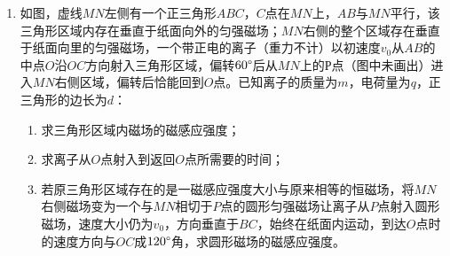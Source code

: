\begin{enumerate}
\newpage
\item 
如图，虚线$ MN $左侧有一个正三角形$ ABC $，$ C $点在$ MN $上，$ AB $与$ MN $平行，该三角形区域内存在垂直于纸面向外的匀强磁场；$ MN $右侧的整个区域存在垂直于纸面向里的匀强磁场，一个带正电的离子（重力不计）以初速度$ v_{0} $从$ AB $的中点$ O $沿$ OC $方向射入三角形区域，偏转$ 60 \degree  $后从$ MN $上的Р点（图中未画出）进入$ MN $右侧区域，偏转后恰能回到$ O $点。已知离子的质量为$ m $，电荷量为$ q $，正三角形的边长为$ d $：
\begin{enumerate}
	\item
	求三角形区域内磁场的磁感应强度；
	\item 
	求离子从$ O $点射入到返回$ O $点所需要的时间； 
	\item 
	若原三角形区域存在的是一磁感应强度大小与原来相等的恒磁场，将$ MN $右侧磁场变为一个与$ MN $相切于$ P $点的圆形匀强磁场让离子从$ P $点射入圆形磁场，速度大小仍为$ v_{0} $，方向垂直于$ BC $，始终在纸面内运动，到达$ O $点时的速度方向与$ OC $成$ 120 \degree  $角，求圆形磁场的磁感应强度。

	
\end{enumerate}
\begin{figure}[h!]
	\flushright
	
\end{figure}











	
	
	
\end{enumerate}

